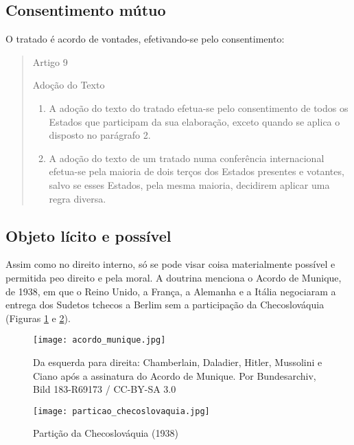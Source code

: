 \documentclass{article}
\begin{document}
\subsection{Consentimento mútuo}

O tratado é acordo de vontades, efetivando-se pelo consentimento:

\begin{quote}

    \begin{center}
         Artigo 9

        Adoção do Texto 
    \end{center}

    \begin{enumerate}
        \item A adoção do texto do tratado efetua-se pelo consentimento de todos os Estados que participam da sua elaboração, exceto quando se aplica o disposto no parágrafo 2.
        \item A adoção do texto de um tratado numa conferência internacional efetua-se pela maioria de dois terços dos Estados presentes e votantes, salvo se esses Estados, pela mesma maioria, decidirem aplicar uma regra diversa.
    \end{enumerate}

    \cite{brasil_decreto_2009}
\end{quote}

\subsection{Objeto lícito e possível}

Assim como no direito interno, só se pode visar coisa materialmente possível e permitida peo direito e pela moral. A doutrina menciona o Acordo de Munique, de 1938, em que o Reino Unido, a França, a Alemanha e a Itália negociaram a entrega dos Sudetos tchecos a Berlim sem a participação da Checoslováquia (Figuras \ref{fig:acordo_munique} e \ref{fig:particao_checoslovaquia}).

\begin{figure}
    \centering
    \texttt{[image: acordo\_munique.jpg]}
    \caption{Da esquerda para direita: Chamberlain, Daladier, Hitler, Mussolini e Ciano após a assinatura do Acordo de Munique. Por Bundesarchiv, Bild 183-R69173 / CC-BY-SA 3.0}
    \label{fig:acordo_munique}
\end{figure}

\begin{figure}
    \centering
    \texttt{[image: particao\_checoslovaquia.jpg]}
    \caption{Partição da Checoslováquia (1938)}
    \label{fig:particao_checoslovaquia}
\end{figure}
\end{document}

